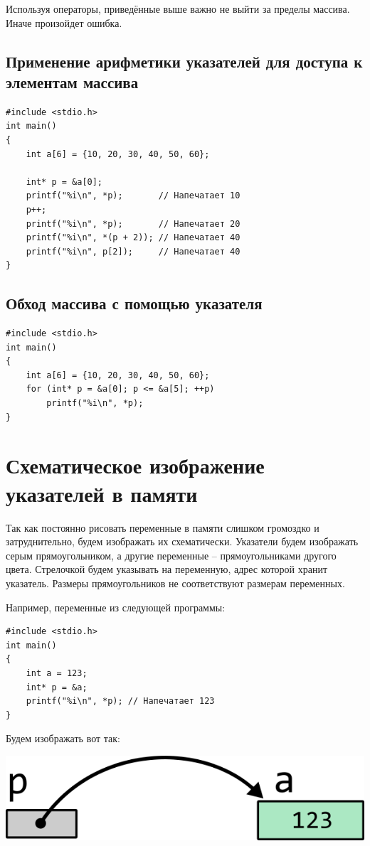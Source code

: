 \documentclass[10pt]{article}
\begin{document}
Используя операторы, приведённые выше важно не выйти за пределы массива. Иначе произойдет ошибка. 

\subsection*{Применение арифметики указателей для доступа к элементам массива}
\begin{lstlisting}
#include <stdio.h>
int main() 
{
    int a[6] = {10, 20, 30, 40, 50, 60};
    
    int* p = &a[0];
    printf("%i\n", *p);       // Напечатает 10
    p++;
    printf("%i\n", *p);       // Напечатает 20
    printf("%i\n", *(p + 2)); // Напечатает 40
    printf("%i\n", p[2]);     // Напечатает 40
}
\end{lstlisting}


\subsection*{Обход массива с помощью указателя}
\begin{lstlisting}
#include <stdio.h>
int main() 
{
    int a[6] = {10, 20, 30, 40, 50, 60};
    for (int* p = &a[0]; p <= &a[5]; ++p) 
        printf("%i\n", *p);
}
\end{lstlisting}



\newpage

\section*{Схематическое изображение указателей в памяти}
Так как постоянно рисовать переменные в памяти слишком громоздко и затруднительно, будем изображать их схематически. Указатели будем изображать серым прямоугольником, а другие переменные -- прямоугольниками другого цвета. Стрелочкой будем указывать на переменную, адрес которой хранит указатель. Размеры прямоугольников не соответствуют размерам переменных.\\

\begin{minipage}{0.5\linewidth}
\noindent Например, переменные из следующей программы:
\begin{lstlisting}
#include <stdio.h>
int main() 
{
    int a = 123;
    int* p = &a;
    printf("%i\n", *p); // Напечатает 123
}
\end{lstlisting}
\end{minipage}
\begin{minipage}{0.45\linewidth}
Будем изображать вот так:
\begin{center}
\includegraphics[scale=1]{../images/memory_3_pointer_to_int_b_scheme.png}
\end{center}
\end{minipage}
\end{document}
